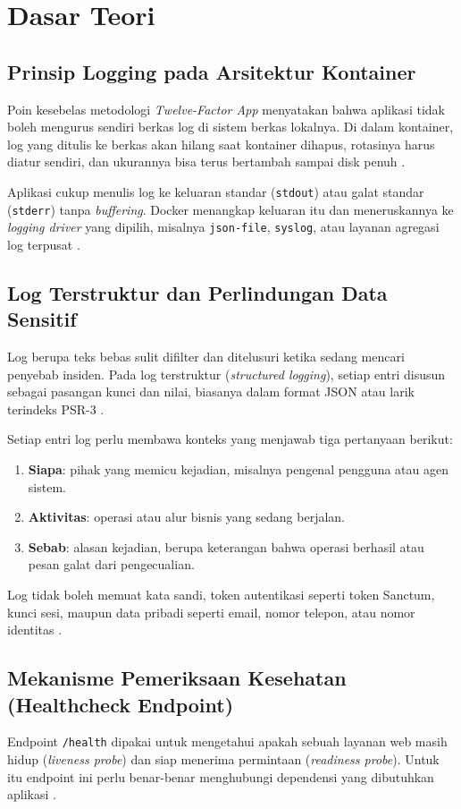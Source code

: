 \documentclass[a4paper,oneside,12pt]{report}
\begin{document}
\clearpage

\chapter{Dasar Teori}

\section{Prinsip Logging pada Arsitektur Kontainer}
Poin kesebelas metodologi \textit{Twelve-Factor App} menyatakan bahwa aplikasi tidak boleh mengurus sendiri berkas log di sistem berkas lokalnya. Di dalam kontainer, log yang ditulis ke berkas akan hilang saat kontainer dihapus, rotasinya harus diatur sendiri, dan ukurannya bisa terus bertambah sampai disk penuh \cite{twelve-factor}.

Aplikasi cukup menulis log ke keluaran standar (\texttt{stdout}) atau galat standar (\texttt{stderr}) tanpa \textit{buffering}. Docker menangkap keluaran itu dan meneruskannya ke \textit{logging driver} yang dipilih, misalnya \texttt{json-file}, \texttt{syslog}, atau layanan agregasi log terpusat \cite{docker-logging}.

\section{Log Terstruktur dan Perlindungan Data Sensitif}
Log berupa teks bebas sulit difilter dan ditelusuri ketika sedang mencari penyebab insiden. Pada log terstruktur (\textit{structured logging}), setiap entri disusun sebagai pasangan kunci dan nilai, biasanya dalam format JSON atau larik terindeks PSR-3 \cite{monolog}.

Setiap entri log perlu membawa konteks yang menjawab tiga pertanyaan berikut:
\begin{enumerate}
    \item \textbf{Siapa}: pihak yang memicu kejadian, misalnya pengenal pengguna atau agen sistem.
    \item \textbf{Aktivitas}: operasi atau alur bisnis yang sedang berjalan.
    \item \textbf{Sebab}: alasan kejadian, berupa keterangan bahwa operasi berhasil atau pesan galat dari pengecualian.
\end{enumerate}
Log tidak boleh memuat kata sandi, token autentikasi seperti token Sanctum, kunci sesi, maupun data pribadi seperti email, nomor telepon, atau nomor identitas \cite{owasp-logging}.

\section{Mekanisme Pemeriksaan Kesehatan (Healthcheck Endpoint)}
Endpoint \texttt{/health} dipakai untuk mengetahui apakah sebuah layanan web masih hidup (\textit{liveness probe}) dan siap menerima permintaan (\textit{readiness probe}). Untuk itu endpoint ini perlu benar-benar menghubungi dependensi yang dibutuhkan aplikasi \cite{docker-healthcheck}.
\end{document}
